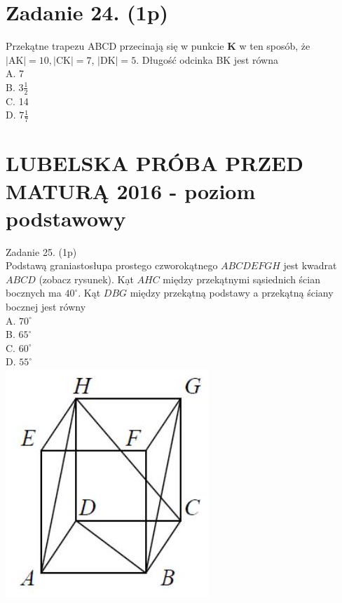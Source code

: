 \documentclass[10pt]{article}
\begin{document}
\section*{Zadanie 24. (1p)}
Przekątne trapezu ABCD przecinają się w punkcie \(\boldsymbol{K}\) w ten sposób, że \(|\mathrm{AK}|=10,|\mathrm{CK}|=7\), \(|\mathrm{DK}|=5\). Długość odcinka BK jest równa\\
A. 7\\
B. \(3 \frac{1}{2}\)\\
C. 14\\
D. \(7 \frac{1}{7}\)

\section*{LUBELSKA PRÓBA PRZED MATURĄ 2016 - poziom podstawowy}
Zadanie 25. (1p)\\
Podstawą graniastosłupa prostego czworokątnego \(A B C D E F G H\) jest kwadrat \(A B C D\) (zobacz rysunek). Kạt \(A H C\) między przekątnymi sąsiednich ścian bocznych ma \(40^{\circ}\). Kąt \(D B G\) między przekątną podstawy a przekątną ściany bocznej jest równy\\
A. \(70^{\circ}\)\\
B. \(65^{\circ}\)\\
C. \(60^{\circ}\)\\
D. \(55^{\circ}\)\\
\includegraphics[max width=\textwidth, center]{2024_11_21_9d761ca624f0efee99a4g-07}
\end{document}
